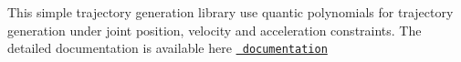 This simple trajectory generation library use quantic polynomials for trajectory generation under joint position, velocity and acceleration constraints. The detailed documentation is available here \href{documentation/index.html]}{\texttt{ documentation}} 